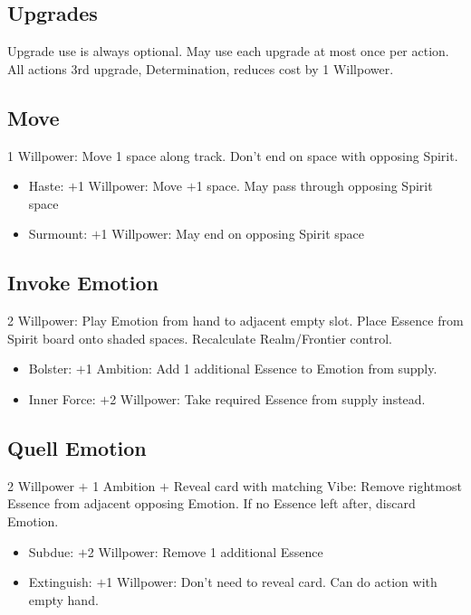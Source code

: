\documentclass[10pt]{article}
\newenvironment{itemizeCustom}
{\begin{itemize}
  \setlength{\itemsep}{1pt}
  \setlength{\parskip}{0pt}
  \setlength{\parsep}{0pt}}
{\end{itemize}}
\begin{document}
\begin{multicols*}{2}
\subsection*{Upgrades}
Upgrade use is always optional. May use each upgrade at most once per action. All actions 3rd upgrade, Determination, reduces cost by 1 Willpower.

\subsection*{Move}
1 Willpower: Move 1 space along track. Don't end on space with opposing Spirit.
\begin{itemizeCustom}
    \item Haste: $+$1 Willpower: Move $+$1 space. May pass through opposing Spirit space
    \item Surmount: $+$1 Willpower: May end on opposing Spirit space
\end{itemizeCustom}

\subsection*{Invoke Emotion}
2 Willpower: Play Emotion from hand to adjacent empty slot. Place Essence from Spirit board onto shaded spaces. Recalculate Realm/Frontier control.
\begin{itemizeCustom}
    \item Bolster: $+$1 Ambition: Add 1 additional Essence to Emotion from supply.
    \item Inner Force: $+$2 Willpower: Take required Essence from supply instead.
\end{itemizeCustom}

\subsection*{Quell Emotion}
2 Willpower $+$ 1 Ambition $+$ Reveal card with matching Vibe: Remove rightmost Essence from adjacent opposing Emotion. If no Essence left after, discard Emotion.
\begin{itemizeCustom}
    \item Subdue: $+$2 Willpower: Remove 1 additional Essence
    \item Extinguish: $+$1 Willpower: Don't need to reveal card. Can do action with empty hand.
\end{itemizeCustom}


\end{multicols*}
\end{document}
